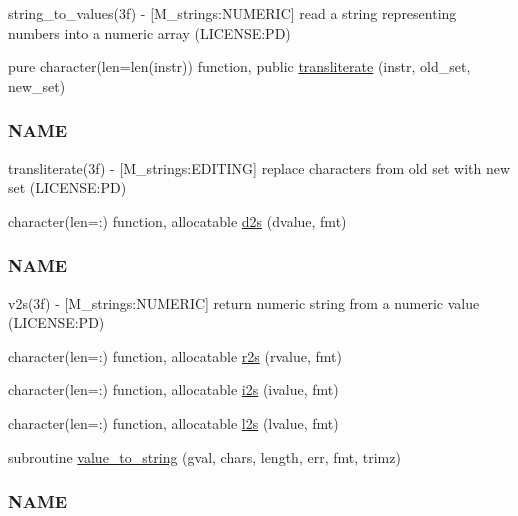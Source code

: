 \begin{DoxyCompactItemize}
\begin{DoxyCompactList}
string\+\_\+to\+\_\+values(3f) -\/ \mbox{[}M\+\_\+strings\+:N\+U\+M\+E\+R\+IC\mbox{]} read a string representing numbers into a numeric array (L\+I\+C\+E\+N\+SE\+:PD) \end{DoxyCompactList}\item 
pure character(len=len(instr)) function, public \mbox{\hyperlink{namespacem__time__duplicate_ac8388a45881cf7c2f9047b4d643ed3f2}{transliterate}} (instr, old\+\_\+set, new\+\_\+set)
\begin{DoxyCompactList}\small\item\em \subsubsection*{N\+A\+ME}

transliterate(3f) -\/ \mbox{[}M\+\_\+strings\+:E\+D\+I\+T\+I\+NG\mbox{]} replace characters from old set with new set (L\+I\+C\+E\+N\+SE\+:PD) \end{DoxyCompactList}\item 
character(len=\+:) function, allocatable \mbox{\hyperlink{namespacem__time__duplicate_a84f53c1e0d6c1c9fe70b19549921d14b}{d2s}} (dvalue, fmt)
\begin{DoxyCompactList}\small\item\em \subsubsection*{N\+A\+ME}

v2s(3f) -\/ \mbox{[}M\+\_\+strings\+:N\+U\+M\+E\+R\+IC\mbox{]} return numeric string from a numeric value (L\+I\+C\+E\+N\+SE\+:PD) \end{DoxyCompactList}\item 
character(len=\+:) function, allocatable \mbox{\hyperlink{namespacem__time__duplicate_a9d1f96975ddf101c13c2f7f0dbf92a02}{r2s}} (rvalue, fmt)
\item 
character(len=\+:) function, allocatable \mbox{\hyperlink{namespacem__time__duplicate_a7570c5a3b71c4ea4f376a38b285ccbd8}{i2s}} (ivalue, fmt)
\item 
character(len=\+:) function, allocatable \mbox{\hyperlink{namespacem__time__duplicate_a4bd5e96c3ed16383c576c4e362c16b82}{l2s}} (lvalue, fmt)
\item 
subroutine \mbox{\hyperlink{namespacem__time__duplicate_ab836a3b7c441e5b324639db734b7de9f}{value\+\_\+to\+\_\+string}} (gval, chars, length, err, fmt, trimz)
\begin{DoxyCompactList}\small\item\em \subsubsection*{N\+A\+ME}


\end{DoxyCompactList}
\end{DoxyCompactItemize}
